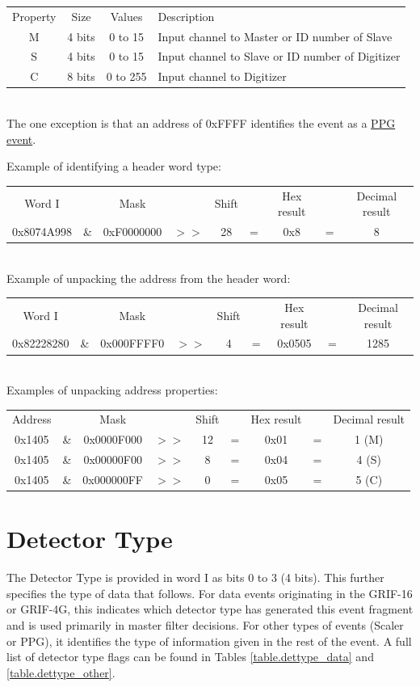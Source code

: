 \documentclass[letterpaper,12pt,notitlepage]{report}
\begin{document}
\begin{tabular}{cccl}
Property & Size & Values & Description\\
M & 4 bits & 0 to 15 & Input channel to Master or ID number of Slave\\
S & 4 bits & 0 to 15 & Input channel to Slave or ID number of Digitizer\\
C & 8 bits & 0 to 255 & Input channel to Digitizer\\
\end{tabular}\\

The one exception is that an address of 0xFFFF identifies the event as a \hyperref[c.PPG]{PPG event}.

Example of identifying a header word type:\\

\begin{tabular}{ccccccccc}
Word I &  & Mask & & Shift & & Hex result & & Decimal result\\
0x8074A998 & \& & 0xF0000000 & $>>$ & 28 & = & 0x8 & = & 8\\
\end{tabular}\\

Example of unpacking the address from the header word:\\
\begin{tabular}{ccccccccc}
Word I &  & Mask & & Shift & & Hex result & & Decimal result\\
0x82228280 & \& & 0x000FFFF0 & $>>$ & 4 & = & 0x0505 & = & 1285\\
\end{tabular}\\

Examples of unpacking address properties:\\

\begin{tabular}{ccccccccc}
Address &  & Mask & & Shift & & Hex result & & Decimal result\\
0x1405 & \& & 0x0000F000 & $>>$ & 12 & = & 0x01 & = & 1 (M)\\
0x1405 & \& & 0x00000F00 & $>>$ & 8 & = & 0x04 & = & 4 (S)\\
0x1405 & \& & 0x000000FF & $>>$ & 0 & = & 0x05 & = & 5 (C)\\
\end{tabular}

\section{Detector Type}
The Detector Type is provided in word I as bits 0 to 3 (4 bits). This further specifies the type of data that follows. For data events originating in the GRIF-16 or GRIF-4G, this indicates which detector type has generated this event fragment and is used primarily in master filter decisions. For other types of events (Scaler or PPG), it identifies the type of information given in the rest of the event. A full list of detector type flags can be found in Tables \ref{table.dettype_data} and \ref{table.dettype_other}.\\
\end{document}
